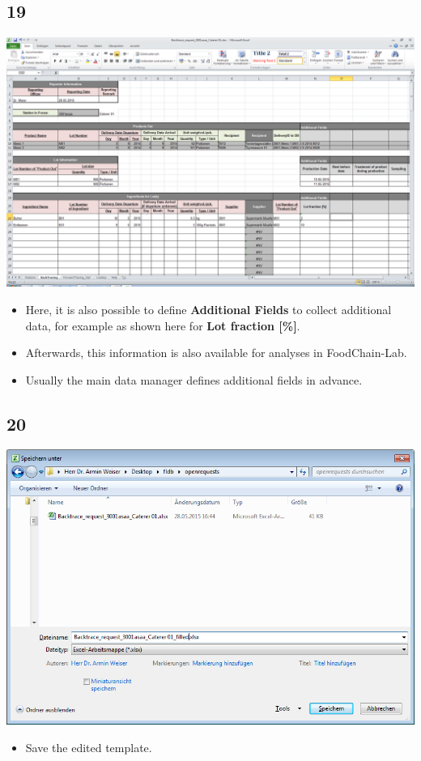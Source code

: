 \documentclass{beamer}
\begin{document}
\subsection{19}
\begin{frame}
	\begin{center}
  		\includegraphics[height=0.6\textheight]{19.png}
	\end{center}
	\begin{itemize}
		\item Here, it is also possible to define \textbf{Additional Fields} to collect additional data, for example as shown here for \textbf{Lot fraction [\%]}.
		\item Afterwards, this information is also available for analyses in FoodChain-Lab.
		\item Usually the main data manager defines additional fields in advance.
	\end{itemize}
\end{frame}

\subsection{20}
\begin{frame}
	\begin{center}
  		\includegraphics[height=0.6\textheight]{20.png}
	\end{center}
	\begin{itemize}
		\item Save the edited template.
	\end{itemize}
\end{frame}
\end{document}
